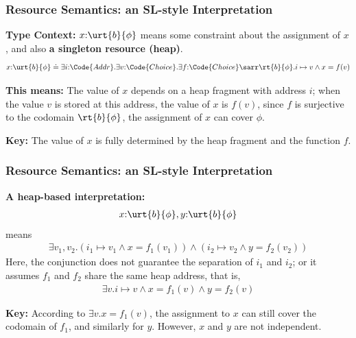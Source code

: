 \begin{frame}[fragile]
    \frametitle{Resource Semantics: an SL-style Interpretation}

\textbf{Type Context:} $x{:}\urt{b}{\phi}$ means some constraint about the assignment of $x$, and also \textbf{a singleton resource (heap)}.
\begin{align*}
    x{:}\urt{b}{\phi} \doteq \exists i{:}\Code{Addr}.\exists v{:}\Code{Choice}.\exists f{:}\Code{Choice}\sarr \rt{b}{\phi}. i\mapsto v \land x = f(v)
\end{align*}

\textbf{This means:} The value of $x$ depends on a heap fragment with address $i$; when the value $v$ is stored at this address, the value of $x$ is $f(v)$, since $f$ is surjective to the codomain $\rt{b}{\phi}$, the assignment of $x$ can cover $\phi$.

\textbf{Key:} The value of $x$ is fully determined by the heap fragment and the function $f$.

\end{frame}

\begin{frame}[fragile]
    \frametitle{Resource Semantics: an SL-style Interpretation}

\textbf{A heap-based interpretation:}
\begin{align*}
    x{:}\urt{b}{\phi}, y{:}\urt{b}{\phi} 
\end{align*}
means
\begin{align*}
    \exists v_1, v_2. (i_1 \mapsto v_1 \land x = f_1(v_1)) \land (i_2 \mapsto v_2 \land y = f_2(v_2))
\end{align*}
Here, the conjunction does not guarantee the separation of $i_1$ and $i_2$; or it assumes $f_1$ and $f_2$ share the same heap address, that is,
\begin{align*}
    \exists v. i \mapsto v \land x = f_1(v) \land y = f_2(v)
\end{align*}

\textbf{Key:} According to $\exists v. x = f_1(v)$, the assignment to $x$ can still cover the codomain of $f_1$, and similarly for $y$. However, $x$ and $y$ are not independent.
\end{frame}

